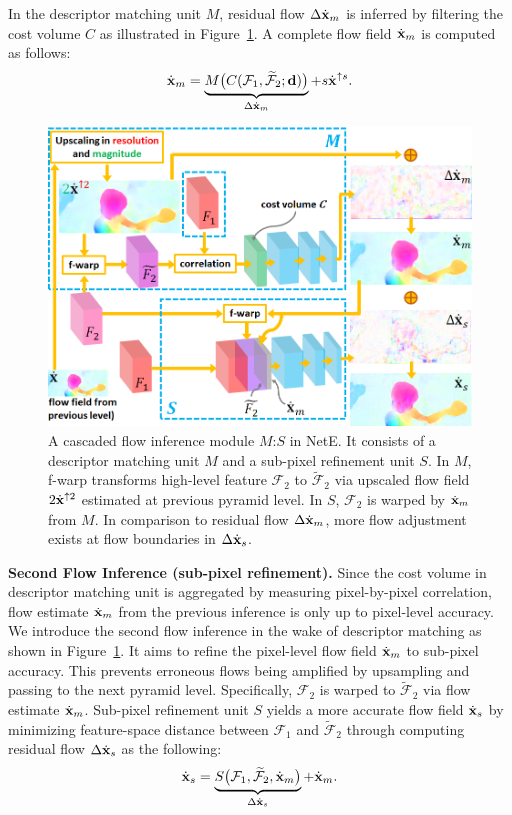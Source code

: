 \documentclass[10pt,twocolumn,letterpaper]{article}
\begin{document}
In the descriptor matching unit $M$, residual flow $\Delta\dot{\bf x}_{m}$ is inferred by filtering the cost volume $C$ as illustrated in Figure~\ref{fig:Ck}. A complete flow field $\dot{\bf x}_{m}$ is computed as follows:
%
\begin{equation}
\dot{\bf x}_{m} = \underbrace{M\big(C({\mathcal F}_{1}, \widetilde {\mathcal F}_{2}; {\bf d})\big)}_{\Delta \dot{\bf x}_{m}} + s\dot{\bf x}^{\uparrow s}.
\end{equation}
%
\begin{figure}[t]
\centering
   \includegraphics[width=\linewidth]{figure/M-S.png}
\caption{A cascaded flow inference module $M$:$S$ in NetE. It consists of a descriptor matching unit $M$ and a sub-pixel refinement unit $S$. In $M$, f-warp transforms high-level feature ${\mathcal F}_{2}$ to $\widetilde{\mathcal F}_{2}$ via upscaled flow field $2 \dot{\bf x}^{ \uparrow 2}$ estimated at previous pyramid level. In $S$, $\mathcal F_{2}$ is warped by $\dot{\bf x}_{m}$ from $M$. In comparison to residual flow $\Delta \dot{\bf x}_{m}$, more flow adjustment exists at flow boundaries in $\Delta \dot{\bf x}_{s}$.}
\label{fig:Ck}
\end{figure}

\noindent 
\textbf{Second Flow Inference (sub-pixel refinement).} Since the cost volume in descriptor matching unit is aggregated by measuring pixel-by-pixel correlation, flow estimate $\dot{\bf x}_{m}$ from the previous inference is only up to pixel-level accuracy. We introduce the second flow inference in the wake of descriptor matching as shown in Figure~\ref{fig:Ck}. It aims to refine the pixel-level flow field $\dot{\bf x}_{m}$ to sub-pixel accuracy. This prevents erroneous flows being amplified by upsampling and passing to the next pyramid level. Specifically, ${\mathcal F}_{2}$ is warped to $\widetilde {\mathcal F}_{2}$ via flow estimate $\dot{\bf x}_{m}$. Sub-pixel refinement unit $S$ yields a more accurate flow field $\dot{\bf x}_{s}$ by minimizing feature-space distance between ${\mathcal F}_{1}$ and $\widetilde {\mathcal F}_{2}$ through computing residual flow $\Delta \dot{\bf x}_{s}$ as the following:
%
\begin{equation}
\dot{\bf x}_{s} = \underbrace{S\big({\mathcal F}_{1}, \widetilde {\mathcal F}_{2}, \dot{\bf x}_{m}\big)}_{\Delta \dot{\bf x}_{s}} + \dot{\bf x}_{m}.
\end{equation}
\end{document}
